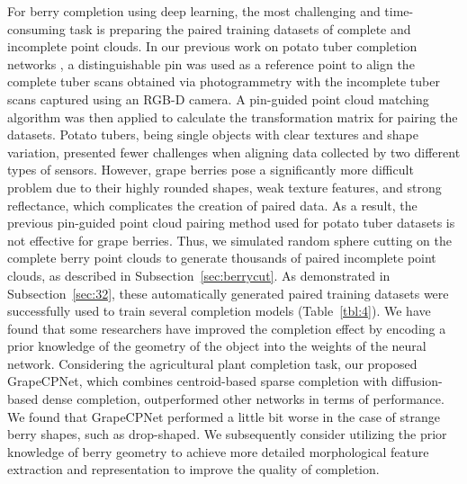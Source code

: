 \documentclass[12pt]{article}
\begin{document}
For berry completion using deep learning, the most challenging and time-consuming task is preparing the paired training datasets of complete and incomplete point clouds.
In our previous work on potato tuber completion networks \citep{blok_highthroughput_2025}, a distinguishable pin was used as a reference point to align the complete tuber scans obtained via photogrammetry with the incomplete tuber scans captured using an RGB-D camera.
A pin-guided point cloud matching algorithm was then applied to calculate the transformation matrix for pairing the datasets.
Potato tubers, being single objects with clear textures and shape variation, presented fewer challenges when aligning data collected by two different types of sensors.
However, grape berries pose a significantly more difficult problem due to their highly rounded shapes, weak texture features, and strong reflectance, which complicates the creation of paired data.
As a result, the previous pin-guided point cloud pairing method used for potato tuber datasets is not effective for grape berries.
Thus, we simulated random sphere cutting on the complete berry point clouds to generate thousands of paired incomplete point clouds, as described in Subsection~\ref{sec:berrycut}.
As demonstrated in Subsection~\ref{sec:32}, these automatically generated paired training datasets were successfully used to train several completion models (Table~\ref{tbl:4}).
We have found that some researchers \citep{pan_panoptic_2023,magistri_efficient_2024} have improved the completion effect by encoding a prior knowledge of the geometry of the object into the weights of the neural network. 
Considering the agricultural plant completion task, our proposed GrapeCPNet, which combines centroid-based sparse completion with diffusion-based dense completion, outperformed other networks in terms of performance.
We found that GrapeCPNet performed a little bit worse in the case of strange berry shapes, such as drop-shaped.
We subsequently consider utilizing the prior knowledge of berry geometry to achieve more detailed morphological feature extraction and representation to improve the quality of completion. 
\end{document}
